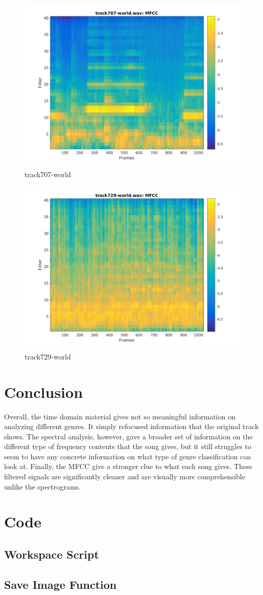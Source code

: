 \documentclass[11pt, a4paper]{article}
\begin{document}
\begin{figure}[H]
    \centering
    \includegraphics[width=.8\textwidth]{track707-world-mfcc.png}
    \caption{track707-world}
\end{figure}


\begin{figure}[H]
    \centering
    \includegraphics[width=.8\textwidth]{track729-world-mfcc.png}
    \caption{track729-world}
\end{figure}

\section{Conclusion}

Overall, the time domain material gives not so meaningful information on analyzing different genres. It simply refocused information that the original track shows. The spectral analysis, however, gave a broader set of information on the different type of frequency contents that the song gives, but it still struggles to seem to have any concrete information on what type of genre classification can look at. Finally, the MFCC give a stronger clue to what each song gives. These filtered signals are significantly cleaner and are visually more comprehensible unlike the spectrograms.

\appendix

\section{Code}

\subsection{Workspace Script}


\subsection{Save Image Function}

\end{document}
